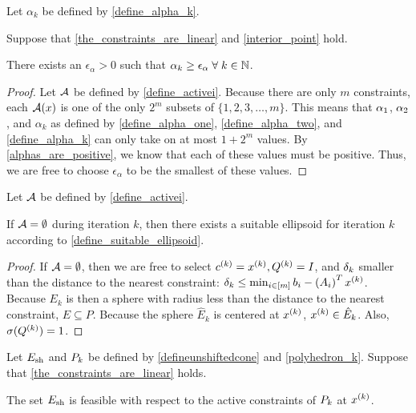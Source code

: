 \begin{lemma}
\label{alphas_are_bounded}
Let $\alpha_k$ be defined by \cref{define_alpha_k}.

Suppose that \cref{the_constraints_are_linear} and \cref{interior_point} hold.

There exists an $\epsilon_{\alpha} > 0$ such that $\alpha_k \ge \epsilon_{\alpha} \; \forall \; k \in \mathbb N$.
\end{lemma}
\begin{proof}
Let ${\mathcal A}$ be defined by \cref{define_activei}.
Because there are only $m$ constraints, each ${\mathcal A}(x)$ is one of the only $2^m$ subsets of  $\{1, 2, 3, \ldots, m\}$.
This means that ${\alpha_1}$, ${\alpha_2}$, and $\alpha_k$ as defined by \cref{define_alpha_one}, \cref{define_alpha_two}, and \cref{define_alpha_k} can only take on at most $1 + 2^m$ values.
By \cref{alphas_are_positive}, we know that each of these values must be positive.
Thus, we are free to choose $\epsilon_{\alpha}$ to be the smallest of these values.
\end{proof}

\begin{lemma}
\label{trivial_ellipsoid_exists}
Let ${\mathcal A}$ be defined by \cref{define_activei}.

If ${\mathcal A} = \emptyset$ during iteration $k$, then there exists a suitable ellipsoid for iteration $k$ according to \cref{define_suitable_ellipsoid}.
\end{lemma}
\begin{proof}
If ${\mathcal A} = \emptyset$, then we are free to select ${c^{(k)}} = x^{(k)}, {Q^{(k)}} = I$, and ${\delta_k}$ smaller than the distance to the nearest constraint:
${\delta_k} \le  \min_{i \in [m]} {{b}}_i - \left({{A}}_i\right)^Tx^{(k)}$.
Because $E_k$ is then a sphere with radius less than the distance to the nearest constraint, $E \subseteq P$.
Because the sphere $\hat E_k$ is centered at $x^{(k)}$, $x^{(k)} \in \hat E_k$.
Also, ${\sigma}({Q^{(k)}}) = 1$.
\end{proof}




\begin{lemma}
\label{unshiftedconeisfeasible}
Let ${E_{\textrm{sh}}}$ and ${P_k}$ be defined by \cref{defineunshiftedcone} and \cref{polyhedron_k}.
Suppose that \cref{the_constraints_are_linear} holds.

The set ${E_{\textrm{sh}}}$ is feasible with respect to the active constraints of ${P_k}$ at $x^{(k)}$.
\end{lemma}


